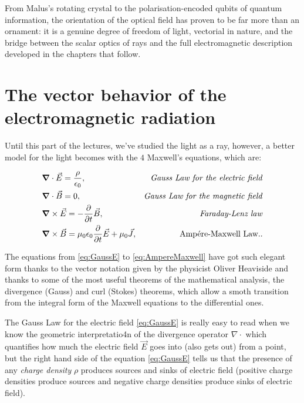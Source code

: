     From Malus's rotating crystal to the polarisation-encoded qubits of quantum information,
    the orientation of the optical field has proven to be far more than an ornament: it is a
    genuine degree of freedom of light, vectorial in nature, and the bridge between the scalar
    optics of rays and the full electromagnetic description developed in the chapters that
    follow.


\section{The vector behavior of the electromagnetic radiation}\label{sec:VectorEM}

    Until this part of the lectures, we've studied the light as a ray, however, a better model for the light becomes with the $4$ Maxwell's equations, which are:
    
    \begin{align}
        & \bm{\nabla} \cdot \vec{E} = \frac{\rho}{\epsilon_0}, & \text{\textit{Gauss Law for the electric field}}\label{eq:GaussE}\\
        & \bm{\nabla} \cdot \vec{B} = 0, & \text{\textit{Gauss Law for the magnetic field}} \label{eq:GaussB}\\
        & \bm{\nabla} \times \vec{E} = -\frac{\partial}{\partial t} \vec{B}, & \text{\textit{Faraday-Lenz law}} \label{eq:FaradayLens}\\
        & \bm{\nabla} \times \vec{B} = \mu_0\epsilon_0 \frac{\partial}{\partial t} \vec{E} + \mu_0 \vec{J}, & \text{Ampére-Maxwell Law}. \label{eq:AmpereMaxwell}.
    \end{align}

    The equations from \ref{eq:GaussE} to \ref{eq:AmpereMaxwell} have got such elegant form thanks to the vector notation given by the physicist Oliver Heaviside and thanks to some of the most useful theorems of the mathematical analysis, the divergence (Gauss) and curl (Stokes) theorems, which allow a smoth transition from the integral form of the Maxwell equations to the differential ones. 

    The Gauss Law for the electric field \ref{eq:GaussE} is really easy to read when we know the geometric interpretatio4n of the divergence operator $\nabla \cdot $ which quantifies how much the electric field $\vec{E}$ goes into (also gets out) from a point, but the right hand side of the equation \ref{eq:GaussE} tells us that the presence of any \textit{charge density} $\rho$ produces sources and sinks of electric field (positive charge densities produce sources and negative charge densities produce sinks of electric field).

